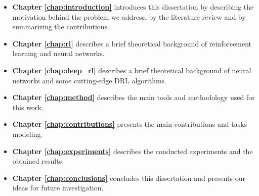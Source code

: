 \begin{itemize}
    \item \textbf{Chapter \ref{chap:introduction}} introduces this dissertation by describing the motivation 
    behind the problem we address, by the literature review and by summarizing the contributions.

    \item \textbf{Chapter \ref{chap:rl}} describes a brief theoretical background of reinforcement learning and neural networks.
    
    \item \textbf{Chapter \ref{chap:deep_rl}} describes a brief theoretical background of neural networks and some cutting-edge DRL algorithms.
    
    \item \textbf{Chapter \ref{chap:method}} describes the main tools and methodology used for this work.
    
    \item \textbf{Chapter \ref{chap:contributions}} presents the main contributions and tasks modeling.
    
    \item \textbf{Chapter \ref{chap:experiments}} describes the conducted experiments and the obtained results.
    
    \item \textbf{Chapter \ref{chap:conclusions}} concludes this dissertation and presents our ideas for future investigation.






\end{itemize}
